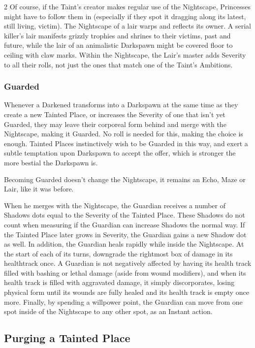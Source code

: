 \begin{multicols}{2}
Of course, if the Taint’s creator makes regular use of the Nightscape, Princesses might have to follow them in (especially if they spot it dragging along its latest, still living, victim). The Nightscape of a lair warps and reflects its owner. A serial killer’s lair manifests grizzly trophies and shrines to their victims, past and future, while the lair of an animalistic Darkspawn might be covered floor to ceiling with claw marks. Within the Nightscape, the Lair’s master adds Severity to all their rolls, not just the ones that match one of the Taint’s Ambitions. 

\subsubsection*{Guarded}

Whenever a Darkened transforms into a Darkspawn at the same time as they create a new Tainted Place, or increases the Severity of one that isn’t yet Guarded, they may leave their corporeal form behind and merge with the Nightscape, making it Guarded. No roll is needed for this, making the choice is enough. Tainted Places instinctively wish to be Guarded in this way, and exert a subtle temptation upon Darkspawn to accept the offer, which is stronger the more bestial the Darkspawn is.

Becoming Guarded doesn’t change the Nightscape, it remains an Echo, Maze or Lair, like it was before. 

When he merges with the Nightscape, the Guardian receives a number of Shadows dots equal to the Severity of the Tainted Place. These Shadows do not count when measuring if the Guardian can increase Shadows the normal way. If the Tainted Place later grows in Severity, the Guardian gains a new Shadow dot as well. In addition, the Guardian heals rapidly while inside the Nightscape. At the start of each of its turns, downgrade the rightmost box of damage in its healthtrack once. A Guardian is not negatively affected by having its health track filled with bashing or lethal damage (aside from wound modifiers), and when its health track is filled with aggravated damage, it simply discorporates, losing physical form until its wounds are fully healed and its health track is empty once more. Finally, by spending a willpower point, the Guardian can move from one spot inside of the Nightscape to any other spot, as an Instant action.

\subsection*{Purging a Tainted Place}


\end{multicols}
